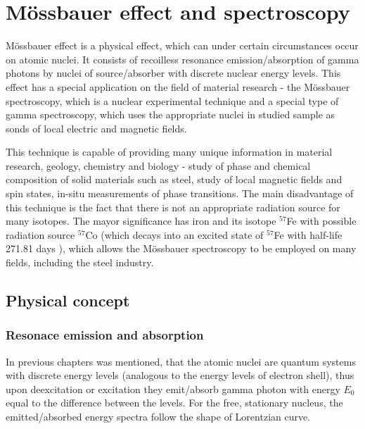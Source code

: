 
\chapter{Mössbauer effect and spectroscopy}
Mössbauer effect is a physical effect, which can under certain circumstances occur on atomic nuclei. It consists of recoilless resonance emission/absorption of gamma photons by nuclei of source/absorber with discrete nuclear energy levels. This effect has a special application on the field of material research - the Mössbauer spectroscopy, which is a nuclear experimental technique and a special type of gamma spectroscopy, which uses the appropriate nuclei in studied sample as sonds of local electric and magnetic fields. 

\par
This technique is capable of providing many unique information in material research, geology, chemistry and biology - study of phase and chemical composition of solid materials such as steel, study of local magnetic fields and spin states, in-situ measurements of phase transitions. The main disadvantage of this technique is the fact that there is not an appropriate radiation source for many isotopes. The mayor significance has iron and its isotope $^{57}$Fe with possible radiation source $^{57}$Co (which decays into an excited state of $^{57}$Fe with half-life 271.81 days \cite{co57}), which allows the Mössbauer spectroscopy to be employed on many fields, including the steel industry.

\section{Physical concept}

\subsection{Resonace emission and absorption}
In previous chapters was mentioned, that the atomic nuclei are quantum systems with discrete energy levels (analogous to the energy levels of electron shell), thus upon deexcitation or excitation they emit/absorb gamma photon with energy $E_0$ equal to the difference between the levels. For the free, stationary nucleus, the emitted/absorbed energy spectra follow the shape of Lorentzian curve. 

